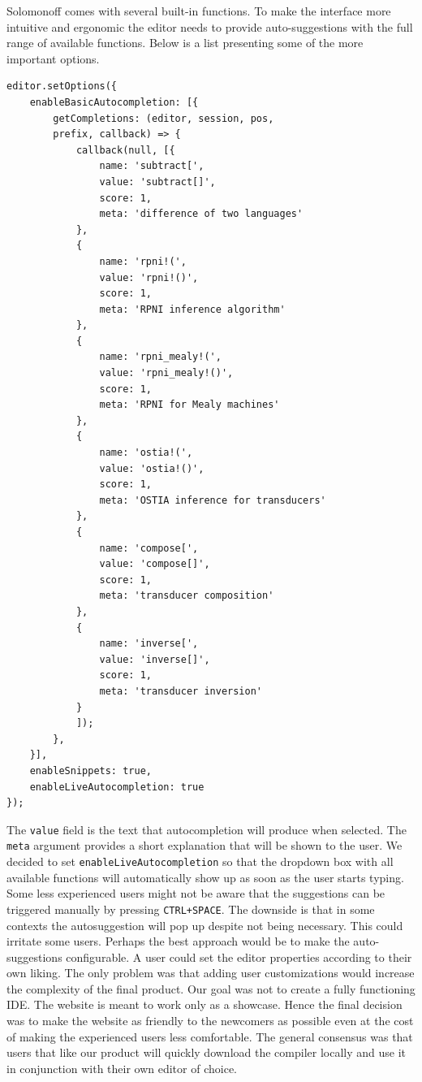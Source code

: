 Solomonoff comes with several built-in functions. To make the interface more intuitive and ergonomic the editor needs to provide auto-suggestions with the full range of available functions. Below is a list presenting some of the more important options.
\begin{lstlisting}
editor.setOptions({
    enableBasicAutocompletion: [{
        getCompletions: (editor, session, pos,
        prefix, callback) => {
            callback(null, [{
                name: 'subtract[',
                value: 'subtract[]',
                score: 1,
                meta: 'difference of two languages'
            },
            {
                name: 'rpni!(',
                value: 'rpni!()',
                score: 1,
                meta: 'RPNI inference algorithm'
            },
            {
                name: 'rpni_mealy!(',
                value: 'rpni_mealy!()',
                score: 1,
                meta: 'RPNI for Mealy machines'
            },
            {
                name: 'ostia!(',
                value: 'ostia!()',
                score: 1,
                meta: 'OSTIA inference for transducers'
            },
            {
                name: 'compose[',
                value: 'compose[]',
                score: 1,
                meta: 'transducer composition'
            },
            {
                name: 'inverse[',
                value: 'inverse[]',
                score: 1,
                meta: 'transducer inversion'
            }
            ]);
        },
    }],
    enableSnippets: true,
    enableLiveAutocompletion: true
});
\end{lstlisting}
The     \texttt{value} field is the text that autocompletion will produce when selected. The     \texttt{meta} argument provides a short explanation that will be shown to the user. We decided to set     \texttt{enableLiveAutocompletion} so that the dropdown box with all available functions will automatically show up as soon as the user starts typing. Some less experienced users might not be aware that the suggestions can be triggered manually by pressing     \texttt{CTRL+SPACE}. The downside is that in some contexts the autosuggestion will pop up  despite not being necessary. This could irritate some users. Perhaps the best approach would be to make the auto-suggestions configurable. A user could set the editor properties according to their own liking. The only problem was that adding user customizations would increase the complexity of the final product. Our goal was not to create a fully functioning IDE. The website is meant to work only as a showcase. Hence the final decision was to make the website as friendly to the newcomers as possible even at the cost of making the experienced users less comfortable. The general consensus was that users that like our product will quickly download the compiler locally and use it in conjunction with their own editor of choice. 

